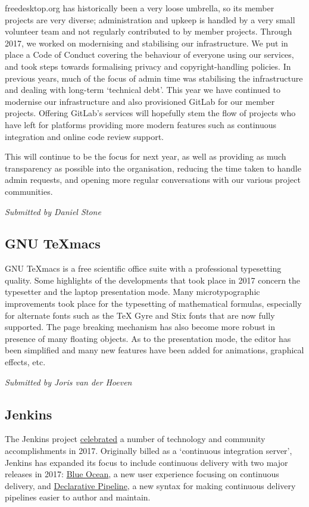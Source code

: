 \documentclass[a4paper]{report}
\begin{document}
freedesktop.org has historically been a very loose umbrella, so its
member projects are very diverse; administration and upkeep is handled
by a very small volunteer team and not regularly contributed to by
member projects. Through 2017, we worked on modernising and stabilising
our infrastructure. We put in place a Code of Conduct covering the
behaviour of everyone using our services, and took steps towards
formalising privacy and copyright-handling policies. In previous years,
much of the focus of admin time was stabilising the infrastructure and
dealing with long-term `technical debt'. This year we have continued to
modernise our infrastructure and also provisioned GitLab for our member
projects. Offering GitLab's services will hopefully stem the flow of
projects who have left for platforms providing more modern features such
as continuous integration and online code review support.

This will continue to be the focus for next year, as well as providing
as much transparency as possible into the organisation, reducing the
time taken to handle admin requests, and opening more regular
conversations with our various project communities.

{\em Submitted by Daniel Stone}

\subsection{GNU TeXmacs}

GNU TeXmacs is a free scientific office suite with a professional
typesetting quality.  Some highlights of the developments that took
place in 2017 concern the typesetter and the laptop presentation mode.
Many microtypographic improvements took place for the typesetting of
mathematical formulas, especially for alternate fonts such as the TeX
Gyre and Stix fonts that are now fully supported.  The page breaking
mechanism has also become more robust in presence of many floating
objects.  As to the presentation mode, the editor has been simplified
and many new features have been added for animations, graphical effects,
etc.

{\em Submitted by Joris van der Hoeven}

\subsection{Jenkins}

The Jenkins project
\href{https://jenkins.io/blog/2017/12/31/new-year/}{celebrated} a number of
technology and community accomplishments in 2017. Originally billed as a
`continuous integration server', Jenkins has expanded its focus to include
continuous delivery with two major releases in 2017:
\href{https://jenkins.io/projects/blueocean}{Blue Ocean}, a new user experience
focusing on continuous delivery, and
\href{https://jenkins.io/doc/book/pipeline/syntax/#declarative-pipeline}{Declarative
Pipeline}, a new syntax for making continuous delivery pipelines easier to
author and maintain.
\end{document}
